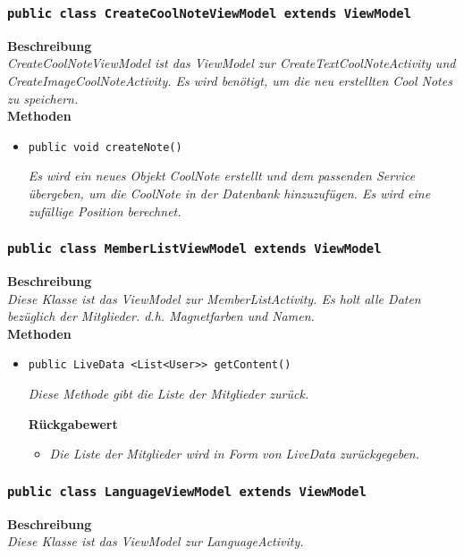         \subsubsection{\texttt{public class CreateCoolNoteViewModel extends ViewModel}}
        \textbf{Beschreibung} \\
        \textit{CreateCoolNoteViewModel ist das ViewModel zur CreateTextCoolNoteActivity und CreateImageCoolNoteActivity. Es wird benötigt, um die neu erstellten Cool Notes zu speichern.}\\
        
		\textbf{Methoden}
 			\begin{itemize}
        		\item\texttt{{public void createNote()}}
        	
        		\textit{Es wird ein neues Objekt CoolNote erstellt und dem passenden Service übergeben, um die CoolNote in der Datenbank hinzuzufügen. Es wird eine zufällige Position berechnet.}
        	
       		\end{itemize}
       		 
        \subsubsection{\texttt{public class MemberListViewModel extends ViewModel}}
        \textbf{Beschreibung} \\
        \textit{Diese Klasse ist das ViewModel zur MemberListActivity. Es holt alle Daten bezüglich der Mitglieder. d.h. Magnetfarben und Namen.}\\
        
		\textbf{Methoden}
 			\begin{itemize}
        		\item\texttt{{public LiveData <List<User>> getContent()}}
        	
        		\textit{Diese Methode gibt die Liste der Mitglieder zurück.}
        		
        	\textbf{Rückgabewert}
        	\begin{itemize}
				\item\textit{Die Liste der Mitglieder wird in Form von LiveData zurückgegeben.}
       		\end{itemize}
       	
       		\end{itemize}
       		 
       
      	\subsubsection{\texttt{public class LanguageViewModel extends ViewModel}}
      	\textbf{Beschreibung} \\
        \textit{Diese Klasse ist das ViewModel zur LanguageActivity.}\\
        
